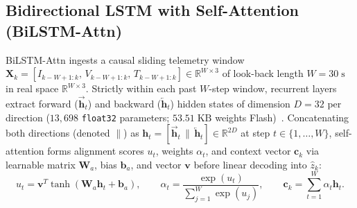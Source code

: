 \documentclass[10pt,a4paper]{article}
\begin{document}
\subsection{Bidirectional LSTM with Self-Attention (BiLSTM-Attn)}
BiLSTM-Attn ingests a causal sliding telemetry window $\mathbf{X}_k = [I_{k-W+1:k},\, V_{k-W+1:k},\, T_{k-W+1:k}] \in \mathbb{R}^{W \times 3}$ of look-back length $W = 30\;\mathrm{s}$ in real space $\mathbb{R}^{W \times 3}$. Strictly within each past $W$-step window, recurrent layers extract forward ($\overrightarrow{\mathbf{h}}_t$) and backward ($\overleftarrow{\mathbf{h}}_t$) hidden states of dimension $D = 32$ per direction ($13,698$ \texttt{float32} parameters; $53.51\;\mathrm{KB}$ weights Flash)~\cite{Song2019bilstm,Vaswani2017attention}. Concatenating both directions (denoted $\|$) as $\mathbf{h}_t = [\overrightarrow{\mathbf{h}}_t \,\|\, \overleftarrow{\mathbf{h}}_t] \in \mathbb{R}^{2 D}$ at step $t \in \{1,\dots,W\}$, self-attention forms alignment scores $u_t$, weights $\alpha_t$, and context vector $\mathbf{c}_k$ via learnable matrix $\mathbf{W}_a$, bias $\mathbf{b}_a$, and vector $\mathbf{v}$ before linear decoding into $\hat{z}_k$:
\begin{equation}\label{eqn:attn_context}
u_t = \mathbf{v}^T \tanh(\mathbf{W}_a \mathbf{h}_t + \mathbf{b}_a), \qquad
\alpha_t = \frac{\exp(u_t)}{\sum_{j=1}^W \exp(u_j)}, \qquad
\mathbf{c}_k = \sum_{t=1}^W \alpha_t \mathbf{h}_t.
\end{equation}
\end{document}
